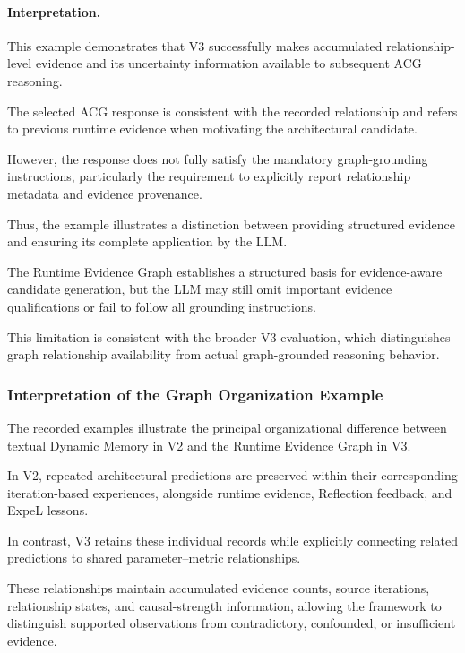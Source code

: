 \paragraph{Interpretation.}

This example demonstrates that V3
successfully makes accumulated
relationship-level evidence and
its uncertainty information available
to subsequent ACG reasoning.

The selected ACG response is consistent
with the recorded relationship and
refers to previous runtime evidence
when motivating the architectural
candidate.

However, the response does not fully
satisfy the mandatory graph-grounding
instructions, particularly the
requirement to explicitly report
relationship metadata and evidence
provenance.

Thus, the example illustrates
a distinction between providing
structured evidence and ensuring
its complete application by the LLM.

The Runtime Evidence Graph establishes
a structured basis for evidence-aware
candidate generation, but the LLM
may still omit important evidence
qualifications or fail to follow
all grounding instructions.

This limitation is consistent with
the broader V3 evaluation, which
distinguishes graph relationship
availability from actual graph-grounded
reasoning behavior.


\subsubsection{Interpretation of the Graph Organization Example}

The recorded examples illustrate the principal
organizational difference between textual
Dynamic Memory in V2 and the Runtime Evidence
Graph in V3.

In V2, repeated architectural predictions
are preserved within their corresponding
iteration-based experiences, alongside
runtime evidence, Reflection feedback,
and ExpeL lessons.

In contrast, V3 retains these individual
records while explicitly connecting
related predictions to shared
parameter--metric relationships.

These relationships maintain accumulated
evidence counts, source iterations,
relationship states, and causal-strength
information, allowing the framework to
distinguish supported observations from
contradictory, confounded, or insufficient
evidence.

